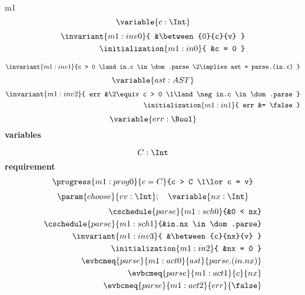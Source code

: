 \documentclass[12pt]{amsart}
\begin{document}
    \begin{machine}{m1}
    \[ \variable{c : \Int} \]
    \begin{align}
        \invariant{m1:inv0}{ &\between{0}{c}{v} } \\
        \initialization{m1:in0}{ &c = 0 } 
    \end{align}
    \begin{itemize}
    \end{itemize}
    \begin{align}
        \invariant{m1:inv1}{c > 0 \land in.c \in \dom.parse 
            \2\implies ast = parse.(in.c) }
    \end{align}
    \[ \variable{ast : AST} \]
    \begin{align}
        \invariant{m1:inv2}{ err &\2\equiv c > 0 
            \1\land \neg in.c \in \dom.parse } \\
        \initialization{m1:in1}{ err &= \false }
    \end{align}
    \[ \variable{ err : \Bool } \]
\noindent \textbf{variables}
\begin{itemize}
\end{itemize}
\[ \dummy{C : \Int} \]
\noindent \textbf{requirement}
\begin{align}
    \progress{m1:prog0}{c = C}{c > C \1\lor c = v}
\end{align}
\[ \param{choose}{vv : \Int} ; \quad \variable{ nx : \Int } \]
\begin{align}
    \cschedule{parse}{m1:sch0}{&0 < nx} \\
    \cschedule{parse}{m1:sch1}{&in.nx \in \dom.parse} \\
    \invariant{m1:inv3}{ &\between{c}{nx}{v} } \\
    \initialization{m1:in2}{ &nx = 0 } \\
    \evbcmeq{parse}{m1:act0}{ast}{ parse.(in.nx) } \\
    \evbcmeq{parse}{m1:act1}{c}{nx} \\
    \evbcmeq{parse}{m1:act2}{err}{\false}
\end{align}
\begin{align*}

\end{align*}
\end{machine}
\end{document}
